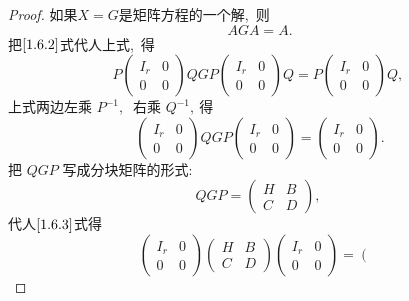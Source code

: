 \begin{proof}
	如果$  X=G  $是矩阵方程的一个解,\  则
	$$A G A=A .$$
	把$\eqref{1.6.2}$式代人上式,\ 得
	\begin{equation}
		P\left(\begin{array}{cc}
			I_{r} & 0 \\
			0 & 0
		\end{array}\right) Q G P\left(\begin{array}{cc}
			I_{r} & 0 \\
			0 & 0
		\end{array}\right) Q=P\left(\begin{array}{cc}
			I_{r} & 0 \\
			0 & 0
		\end{array}\right) Q,\ 
	\end{equation}
	上式两边左乘 $ P^{-1} ,\ $ 右乘 $ Q^{-1} ,\  $得
	\begin{equation}
		\left(\begin{array}{ll}
			I_{r} & 0 \\
			0 & 0
		\end{array}\right) Q G P\left(\begin{array}{ll}
			I_{r} & 0 \\
			0 & 0
		\end{array}\right)=\left(\begin{array}{ll}
			I_{r} & 0 \\
			0 & 0
		\end{array}\right) .\label{1.6.3}
	\end{equation}
	把  $Q G P $ 写成分块矩阵的形式:
	\begin{equation}
		Q G P=\left(\begin{array}{ll}
			H & B \\
			C & D
		\end{array}\right),\ \label{1.6.4}
	\end{equation}
	代人$\eqref{1.6.3}$式得
	$$\left(\begin{array}{ll}
		I_{r} & 0 \\
		0 & 0
	\end{array}\right)\left(\begin{array}{ll}
		H & B \\
		C & D
	\end{array}\right)\left(\begin{array}{ll}
		I_{r} & 0 \\
		0 & 0
	\end{array}\right)=\left(\begin{array}{cc}

\end{array}$$
\end{proof}
